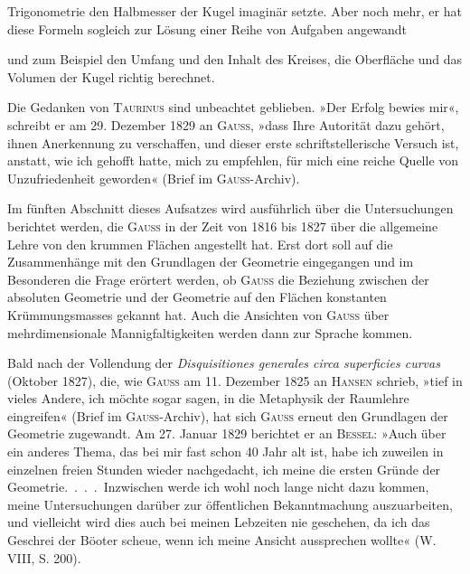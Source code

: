 Trigonometrie den Halbmesser der Kugel imaginär setzte. Aber noch mehr,
er hat diese Formeln sogleich zur Lösung einer Reihe von Aufgaben angewandt
\par\vfill{}
\clearpage{}\setcounter{footnote}{0}
\noindent und zum Beispiel den Umfang und den Inhalt des Kreises, die Oberfläche
und das Volumen der Kugel richtig berechnet.
\par
Die Gedanken von \textsc{Taurinus} sind unbeachtet geblieben. »Der Erfolg
bewies mir«, schreibt er am 29. Dezember 1829 an \textsc{Gauss}, »dass Ihre Autorität
dazu gehört, ihnen Anerkennung zu verschaffen, und dieser erste schriftstellerische
Versuch ist, anstatt, wie ich gehofft hatte, mich zu empfehlen, für
mich eine reiche Quelle von Unzufriedenheit geworden« (Brief im \textsc{Gauss}-Archiv).
\par
Im fünften Abschnitt dieses Aufsatzes wird ausführlich über die Untersuchungen
berichtet werden, die \textsc{Gauss} in der Zeit von 1816 bis 1827 über
die allgemeine Lehre von den krummen Flächen angestellt hat. Erst dort
soll auf die Zusammenhänge mit den Grundlagen der Geometrie eingegangen
und im Besonderen die Frage erörtert werden, ob \textsc{Gauss} die Beziehung zwischen
der absoluten Geometrie und der Geometrie auf den Flächen konstanten
Krümmungsmasses gekannt hat. Auch die Ansichten von \textsc{Gauss} über mehrdimensionale
Mannigfaltigkeiten werden dann zur Sprache kommen.
\par
Bald nach der Vollendung der \textit{Disquisitiones generales circa superficies curvas}
(Oktober 1827), die, wie \textsc{Gauss} am 11. Dezember 1825 an \textsc{Hansen} schrieb,
»tief in vieles Andere, ich möchte sogar sagen, in die Metaphysik der Raumlehre
eingreifen« (Brief im \textsc{Gauss}-Archiv), hat sich \textsc{Gauss} erneut den Grundlagen
der Geometrie zugewandt. Am 27. Januar 1829 berichtet er an \textsc{Bessel}:
»Auch über ein anderes Thema, das bei mir fast schon 40 Jahr alt ist, habe
ich zuweilen in einzelnen freien Stunden wieder nachgedacht, ich meine die
ersten Gründe der Geometrie.\ .\ .\ .\ Inzwischen werde ich wohl noch lange
nicht dazu kommen, meine  Untersuchungen darüber
zur öffentlichen Bekanntmachung auszuarbeiten, und vielleicht wird dies auch
bei meinen Lebzeiten nie geschehen, da ich das Geschrei der Böoter scheue,
wenn ich meine Ansicht  aussprechen wollte« (W. VIII, S. 200).
